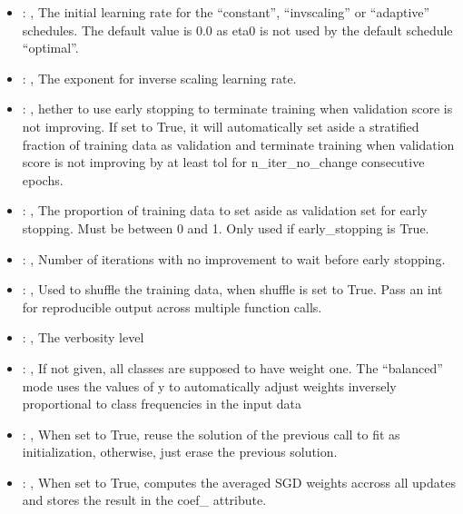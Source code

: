 \begin{itemize}
    \item {}: , 
      The initial learning rate for the ``constant'', ``invscaling'' or ``adaptive'' schedules. The
      default value is 0.0                                                  as eta0 is not used by
      the default schedule ``optimal''.

    \item {}: , 
      The exponent for inverse scaling learning rate.

    \item {}: , 
      hether to use early stopping to terminate training when validation score is not
      improving. If set to True, it will automatically set aside a stratified fraction of training
      data as validation and terminate training when validation score is not improving by at least
      tol for n\_iter\_no\_change consecutive epochs.

    \item {}: , 
      The proportion of training data to set aside as validation set for early stopping.
      Must be between 0 and 1. Only used if early\_stopping is True.

    \item {}: , 
      Number of iterations with no improvement to wait before early stopping.

    \item {}: , 
      Used to shuffle the training data, when shuffle is set to
      True. Pass an int for reproducible output across multiple function calls.

    \item {}: , 
      The verbosity level

    \item {}: \xmlDesc{[balanced]}, 
      If not given, all classes are supposed to have weight one.
      The “balanced” mode uses the values of y to automatically adjust weights
      inversely proportional to class frequencies in the input data

    \item {}: , 
      When set to True, reuse the solution of the previous call
      to fit as initialization, otherwise, just erase the previous solution.

    \item {}: , 
      When set to True, computes the averaged SGD weights accross
      all updates and stores the result in the coef\_ attribute.
  \end{itemize}
